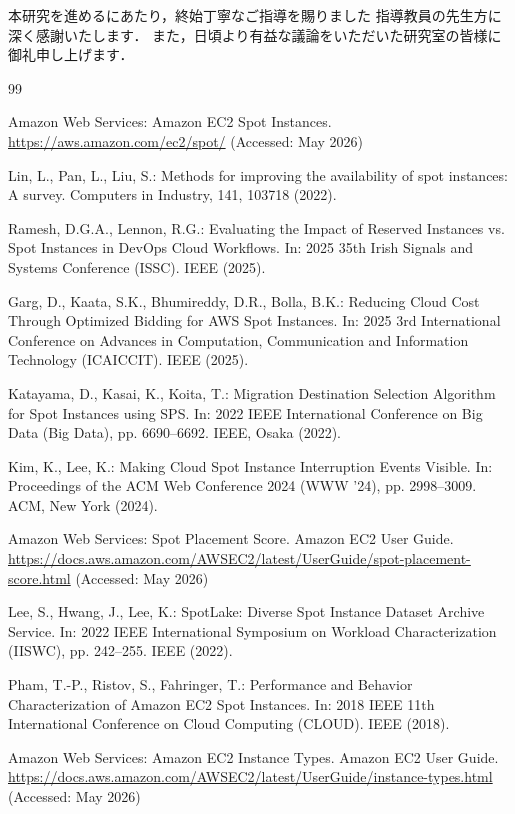 \documentclass[11pt,a4paper]{ltjsreport}
\begin{document}
本研究を進めるにあたり，終始丁寧なご指導を賜りました
指導教員の先生方に深く感謝いたします．
また，日頃より有益な議論をいただいた研究室の皆様に御礼申し上げます．

\begin{thebibliography}{99}

Amazon Web Services:
Amazon EC2 Spot Instances.
\url{https://aws.amazon.com/ec2/spot/}
(Accessed: May 2026)

Lin, L., Pan, L., Liu, S.:
Methods for improving the availability of spot instances: A survey.
Computers in Industry, 141, 103718 (2022).

Ramesh, D.G.A., Lennon, R.G.:
Evaluating the Impact of Reserved Instances vs. Spot Instances in DevOps Cloud Workflows.
In: 2025 35th Irish Signals and Systems Conference (ISSC). IEEE (2025).

Garg, D., Kaata, S.K., Bhumireddy, D.R., Bolla, B.K.:
Reducing Cloud Cost Through Optimized Bidding for AWS Spot Instances.
In: 2025 3rd International Conference on Advances in Computation,
Communication and Information Technology (ICAICCIT). IEEE (2025).

Katayama, D., Kasai, K., Koita, T.:
Migration Destination Selection Algorithm for Spot Instances using SPS.
In: 2022 IEEE International Conference on Big Data (Big Data),
pp. 6690--6692. IEEE, Osaka (2022).

Kim, K., Lee, K.:
Making Cloud Spot Instance Interruption Events Visible.
In: Proceedings of the ACM Web Conference 2024 (WWW '24),
pp. 2998--3009. ACM, New York (2024).

Amazon Web Services:
Spot Placement Score. Amazon EC2 User Guide.
\url{https://docs.aws.amazon.com/AWSEC2/latest/UserGuide/spot-placement-score.html}
(Accessed: May 2026)

Lee, S., Hwang, J., Lee, K.:
SpotLake: Diverse Spot Instance Dataset Archive Service.
In: 2022 IEEE International Symposium on Workload Characterization (IISWC),
pp. 242--255. IEEE (2022).

Pham, T.-P., Ristov, S., Fahringer, T.:
Performance and Behavior Characterization of Amazon EC2 Spot Instances.
In: 2018 IEEE 11th International Conference on Cloud Computing (CLOUD).
IEEE (2018).

Amazon Web Services:
Amazon EC2 Instance Types. Amazon EC2 User Guide.
\url{https://docs.aws.amazon.com/AWSEC2/latest/UserGuide/instance-types.html}
(Accessed: May 2026)

\end{thebibliography}
\end{document}
